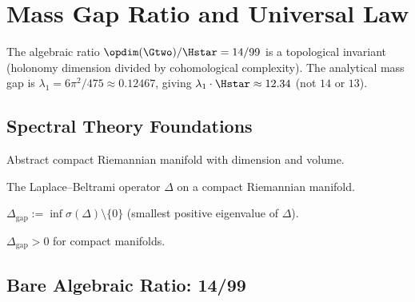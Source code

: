 \chapter{Mass Gap Ratio and Universal Law}\label{chap:mass_gap}

The algebraic ratio $\opdim(\Gtwo) / \Hstar = 14/99$ is a topological invariant
(holonomy dimension divided by cohomological complexity).
The analytical mass gap is $\lambda_1 = 6\pi^2/475 \approx 0.12467$,
giving $\lambda_1 \cdot \Hstar \approx 12.34$ (not $14$ or $13$).

\section{Spectral Theory Foundations}

\begin{definition}\label{def:compact_manifold}
    \leanok
    Abstract compact Riemannian manifold with dimension and volume.
\end{definition}

\begin{definition}\label{def:laplace_beltrami}
    \leanok
    The Laplace--Beltrami operator $\Delta$ on a compact Riemannian manifold.
\end{definition}

\begin{definition}\label{def:mass_gap}
    \leanok
    $\Delta_{\mathrm{gap}} := \inf \sigma(\Delta) \setminus \{0\}$
    (smallest positive eigenvalue of $\Delta$).
\end{definition}

\begin{theorem}\label{thm:mass_gap_pos}
    \leanok
    $\Delta_{\mathrm{gap}} > 0$ for compact manifolds.
\end{theorem}

\section{Bare Algebraic Ratio: 14/99}

